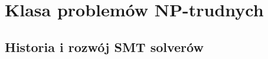 \chapter{Klasa problemów NP-trudnych}

\section{Historia i rozwój SMT solverów}



\begin{lstlisting}
\end{lstlisting}